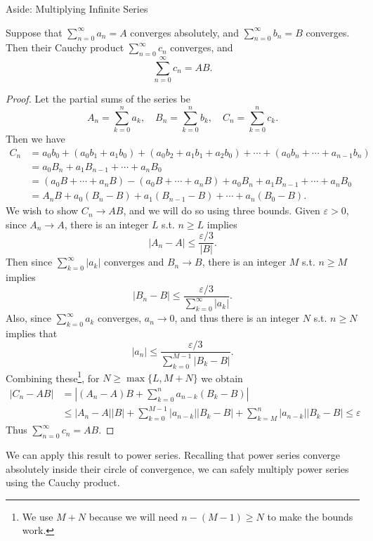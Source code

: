 \begin{aside}{Aside: Multiplying Infinite Series}
\begin{theorem*}
	Suppose that $\sum_{n = 0}^{\infty} a_n = A$ converges absolutely, and $\sum_{n = 0}^{\infty} b_n = B$ converges. Then their Cauchy product $\sum_{n = 0}^{\infty} c_n$ converges, and 
	$$
	\sum_{n = 0}^{\infty} c_n = AB.
	$$
\end{theorem*}
\begin{proof}
	Let the partial sums of the series be
	$$
	A_n = \sum_{k = 0}^{n} a_k, \quad B_n = \sum_{k = 0}^{n} b_k, \quad C_n = \sum_{k = 0}^{n} c_k.
	$$
	Then we have
	\begin{align*}
		C_n &= a_0 b_0 + (a_0 b_1 + a_1 b_0) + (a_0 b_2 + a_1 b_1 + a_2 b_0) + \cdots + (a_0 b_n + \cdots + a_{n - 1} b_n) \\
		&= a_0 B_n + a_1 B_{n - 1} + \cdots + a_n B_0 \\
		&= (a_0 B + \cdots + a_n B) - (a_0 B + \cdots + a_n B) + a_0 B_n + a_1 B_{n - 1} + \cdots + a_n B_0 \\
		&= A_n B + a_0 (B_n - B) + a_1 (B_{n-1} - B) + \cdots + a_n(B_0 - B).
	\end{align*}
	We wish to show $C_n \rightarrow AB$, and we will do so using three bounds. Given $\varepsilon > 0$, since $A_n \rightarrow A$, there is an integer $L$ s.t. $n \geq L$ implies
	$$
	|A_n - A| \leq \frac{\varepsilon /3}{|B|}.
	$$
	Then since $\sum_{k = 0}^{\infty} |a_k|$ converges and $B_n \rightarrow B$, there is an integer $M$ s.t. $n \geq M$ implies
	$$
	|B_n - B| \leq \frac{\varepsilon/3}{\sum_{k = 0}^{\infty} |a_k|}.
	$$
	Also, since $\sum_{k = 0}^{\infty} a_k$ converges, $a_n \rightarrow 0$, and thus there is an integer $N$ s.t. $n \geq N$ implies that
	$$
	|a_n| \leq \frac{\varepsilon/3}{\sum_{k = 0}^{M-1} |B_k - B|}.
	$$
	Combining these\footnote{We use $M + N$ because we will need $n - (M - 1) \geq N$ to make the bounds work.}, for $N \geq \max\{L, M + N\}$ we obtain
	\begin{align*}
		|C_n - AB| &= \left|(A_n - A)B + \sum_{k = 0}^n a_{n - k} (B_k - B)\right| \\
		&\leq |A_n - A||B| + \sum_{k = 0}^{M - 1}|a_{n - k}| |B_k - B| + \sum_{k = M}^{n} |a_{n -k}| |B_{k} - B| \leq \varepsilon
	\end{align*}
	Thus $\sum_{n = 0}^{\infty} c_n = AB$. \qedhere
\end{proof}

We can apply this result to power series. Recalling that power series converge absolutely inside their circle of convergence, we can safely multiply power series using the Cauchy product.


\end{aside}
